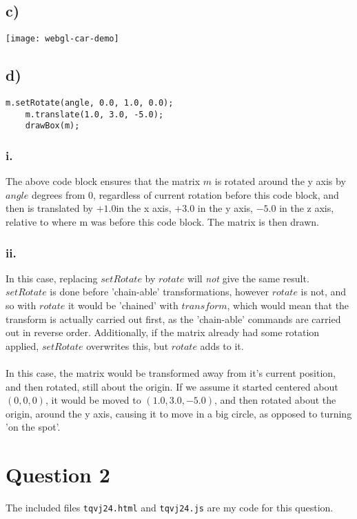 \documentclass[a4paper,12pt]{article}
\begin{document}
\subsection*{c)}
\texttt{[image: webgl-car-demo]}
\newpage
\subsection*{d)}
\begin{lstlisting}[title=Explaining the meaning]
    m.setRotate(angle, 0.0, 1.0, 0.0);
    m.translate(1.0, 3.0, -5.0);
    drawBox(m);
\end{lstlisting}
\subsubsection*{i.}

The above code block ensures that the matrix $m$ is rotated around the y axis by $angle$ degrees from $0$, regardless of current rotation before this code block, and then is translated by $+1.0$in the x axis, $+3.0$ in the y axis, $-5.0$ in the z axis, relative to where m was before this code block. The matrix is then drawn.
\subsubsection*{ii.}
In this case, replacing $setRotate$ by $rotate$ will \textit{not} give the same result. $setRotate$ is done before 'chain-able' transformations, however $rotate$ is not, and so with $rotate$ it would be 'chained' with $transform$, which would mean that the transform is actually carried out first, as the 'chain-able' commands are carried out in reverse order. Additionally, if the matrix already had some rotation applied, $setRotate$ overwrites this, but $rotate$ adds to it.\\\\In this case, the matrix would be transformed away from it's current position, and then rotated, still about the origin. If we assume it started centered about $(0,0,0)$, it would be moved to $(1.0, 3.0, -5.0)$, and then rotated about the origin, around the y axis, causing it to move in a big circle, as opposed to turning 'on the spot'.

\section*{Question 2}
The included files \texttt{tqvj24.html} and \texttt{tqvj24.js} are my code for this question.
\end{document}
